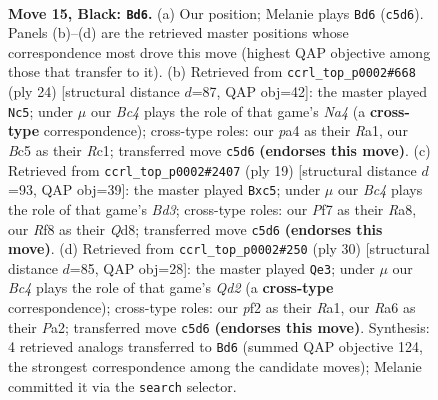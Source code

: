 \documentclass[11pt]{article}
\begin{document}
\clearpage

\begin{figure}[p]\centering
\begin{subfigure}{0.46\textwidth}\centering
\resizebox{\linewidth}{!}{%
\newchessgame
\chessboard[
  setfen={2b2r1k/1p2qp1p/r1n2np1/p1bQ4/P7/1P2PNP1/1B3PBP/RN2R1K1 b - - 0 15},
  showmover=false,
  pgfstyle=straightmove, color=movearrow, markmove={c5-d6}
]}
\caption{}
\end{subfigure}\hfill
\begin{subfigure}{0.46\textwidth}\centering
\resizebox{\linewidth}{!}{%
\newchessgame
\chessboard[
  setfen={rn1r2k1/pp2ppbp/2p2np1/5b2/N1QP4/q4NP1/P2BPPBP/R1R3K1 w - - 2 13},
  showmover=false,
  pgfstyle=straightmove, color=movearrow, markmove={a4-c5}
]}
\caption{}
\end{subfigure}
\\[4pt]
\begin{subfigure}{0.46\textwidth}\centering
\resizebox{\linewidth}{!}{%
\newchessgame
\chessboard[
  setfen={r2qk2r/pp3pp1/2nbbn1p/2Pp4/8/P4NP1/1PP2PBP/RNBQR1K1 b kq - 0 10},
  showmover=false,
  pgfstyle=straightmove, color=movearrow, markmove={d6-c5}
]}
\caption{}
\end{subfigure}\hfill
\begin{subfigure}{0.46\textwidth}\centering
\resizebox{\linewidth}{!}{%
\newchessgame
\chessboard[
  setfen={rr4k1/1p1bppbp/3p1np1/q7/p1PB4/2N3PP/PP1QPPB1/R2R2K1 w - - 1 16},
  showmover=false,
  pgfstyle=straightmove, color=movearrow, markmove={d2-e3}
]}
\caption{}
\end{subfigure}
\caption{\textbf{Move 15, Black: \texttt{Bd6}.} (a) Our position; Melanie plays \texttt{Bd6} (\texttt{c5d6}). Panels (b)--(d) are the retrieved master positions whose correspondence most drove this move (highest QAP objective among those that transfer to it). (b) Retrieved from \texttt{ccrl\_top\_p0002\#668} (ply 24) [structural distance $d$=87, QAP obj=42]: the master played \texttt{Nc5}; under $\mu$ our \emph{Bc4} plays the role of that game's \emph{Na4} (a \textbf{cross-type} correspondence); cross-type roles: our \emph{p}a4 as their \emph{R}a1, our \emph{B}c5 as their \emph{R}c1; transferred move \texttt{c5d6} \textbf{(endorses this move)}. (c) Retrieved from \texttt{ccrl\_top\_p0002\#2407} (ply 19) [structural distance $d$=93, QAP obj=39]: the master played \texttt{Bxc5}; under $\mu$ our \emph{Bc4} plays the role of that game's \emph{Bd3}; cross-type roles: our \emph{P}f7 as their \emph{R}a8, our \emph{R}f8 as their \emph{Q}d8; transferred move \texttt{c5d6} \textbf{(endorses this move)}. (d) Retrieved from \texttt{ccrl\_top\_p0002\#250} (ply 30) [structural distance $d$=85, QAP obj=28]: the master played \texttt{Qe3}; under $\mu$ our \emph{Bc4} plays the role of that game's \emph{Qd2} (a \textbf{cross-type} correspondence); cross-type roles: our \emph{p}f2 as their \emph{R}a1, our \emph{R}a6 as their \emph{P}a2; transferred move \texttt{c5d6} \textbf{(endorses this move)}. Synthesis: 4 retrieved analogs transferred to \texttt{Bd6} (summed QAP objective 124, the strongest correspondence among the candidate moves); Melanie committed it via the \texttt{search} selector.}
\label{fig:thought-m29}
\end{figure}
\end{document}

